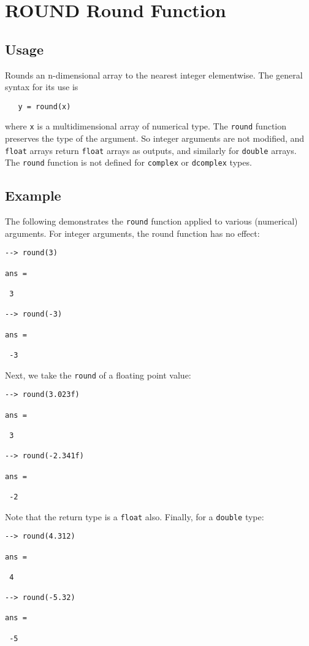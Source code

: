 \section{ROUND Round Function}

\subsection{Usage}

Rounds an n-dimensional array to the nearest integer elementwise.
The general syntax for its use is
\begin{verbatim}
   y = round(x)
\end{verbatim}
where \verb|x| is a multidimensional array of numerical type.  The \verb|round| 
function preserves the type of the argument.  So integer arguments 
are not modified, and \verb|float| arrays return \verb|float| arrays as 
outputs, and similarly for \verb|double| arrays.  The \verb|round| function 
is not defined for \verb|complex| or \verb|dcomplex| types.
\subsection{Example}

The following demonstrates the \verb|round| function applied to various
(numerical) arguments.  For integer arguments, the round function has
no effect:
\begin{verbatim}
--> round(3)

ans = 

 3 

--> round(-3)

ans = 

 -3 
\end{verbatim}
Next, we take the \verb|round| of a floating point value:
\begin{verbatim}
--> round(3.023f)

ans = 

 3 

--> round(-2.341f)

ans = 

 -2 
\end{verbatim}
Note that the return type is a \verb|float| also.  Finally, for a \verb|double|
type:
\begin{verbatim}
--> round(4.312)

ans = 

 4 

--> round(-5.32)

ans = 

 -5 
\end{verbatim}
